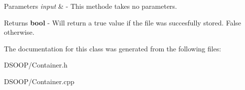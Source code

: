 \begin{DoxyParams}{Parameters}
{\em input} & -\/ This methode takes no parameters.\\
\hline
\end{DoxyParams}
\begin{DoxyReturn}{Returns}
{\bfseries bool} -\/ Will return a true value if the file was succesfully stored. False otherwise. 
\end{DoxyReturn}


The documentation for this class was generated from the following files\+:\begin{DoxyCompactItemize}
\item 
D\+S\+O\+O\+P/Container.\+h\item 
D\+S\+O\+O\+P/Container.\+cpp\end{DoxyCompactItemize}

